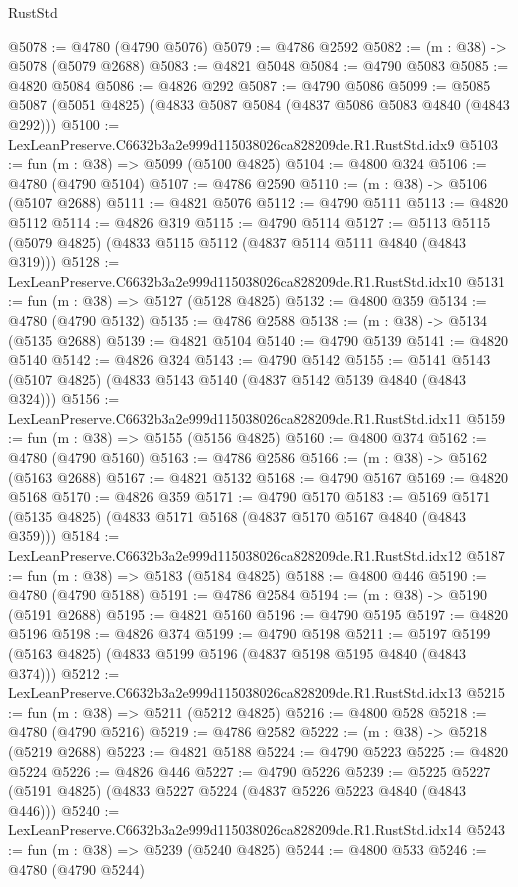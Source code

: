 \begin{lexlean}{RustStd}
\begin{coremodule}
@5078 := @4780 (@4790 @5076)
@5079 := @4786 @2592
@5082 := (m : @38) -> @5078 (@5079 @2688)
@5083 := @4821 @5048
@5084 := @4790 @5083
@5085 := @4820 @5084
@5086 := @4826 @292
@5087 := @4790 @5086
@5099 := @5085 @5087 (@5051 @4825) (@4833 @5087 @5084 (@4837 @5086 @5083 @4840 (@4843 @292)))
@5100 := LexLeanPreserve.C6632b3a2e999d115038026ca828209de.R1.RustStd.idx9
@5103 := fun (m : @38) => @5099 (@5100 @4825)
@5104 := @4800 @324
@5106 := @4780 (@4790 @5104)
@5107 := @4786 @2590
@5110 := (m : @38) -> @5106 (@5107 @2688)
@5111 := @4821 @5076
@5112 := @4790 @5111
@5113 := @4820 @5112
@5114 := @4826 @319
@5115 := @4790 @5114
@5127 := @5113 @5115 (@5079 @4825) (@4833 @5115 @5112 (@4837 @5114 @5111 @4840 (@4843 @319)))
@5128 := LexLeanPreserve.C6632b3a2e999d115038026ca828209de.R1.RustStd.idx10
@5131 := fun (m : @38) => @5127 (@5128 @4825)
@5132 := @4800 @359
@5134 := @4780 (@4790 @5132)
@5135 := @4786 @2588
@5138 := (m : @38) -> @5134 (@5135 @2688)
@5139 := @4821 @5104
@5140 := @4790 @5139
@5141 := @4820 @5140
@5142 := @4826 @324
@5143 := @4790 @5142
@5155 := @5141 @5143 (@5107 @4825) (@4833 @5143 @5140 (@4837 @5142 @5139 @4840 (@4843 @324)))
@5156 := LexLeanPreserve.C6632b3a2e999d115038026ca828209de.R1.RustStd.idx11
@5159 := fun (m : @38) => @5155 (@5156 @4825)
@5160 := @4800 @374
@5162 := @4780 (@4790 @5160)
@5163 := @4786 @2586
@5166 := (m : @38) -> @5162 (@5163 @2688)
@5167 := @4821 @5132
@5168 := @4790 @5167
@5169 := @4820 @5168
@5170 := @4826 @359
@5171 := @4790 @5170
@5183 := @5169 @5171 (@5135 @4825) (@4833 @5171 @5168 (@4837 @5170 @5167 @4840 (@4843 @359)))
@5184 := LexLeanPreserve.C6632b3a2e999d115038026ca828209de.R1.RustStd.idx12
@5187 := fun (m : @38) => @5183 (@5184 @4825)
@5188 := @4800 @446
@5190 := @4780 (@4790 @5188)
@5191 := @4786 @2584
@5194 := (m : @38) -> @5190 (@5191 @2688)
@5195 := @4821 @5160
@5196 := @4790 @5195
@5197 := @4820 @5196
@5198 := @4826 @374
@5199 := @4790 @5198
@5211 := @5197 @5199 (@5163 @4825) (@4833 @5199 @5196 (@4837 @5198 @5195 @4840 (@4843 @374)))
@5212 := LexLeanPreserve.C6632b3a2e999d115038026ca828209de.R1.RustStd.idx13
@5215 := fun (m : @38) => @5211 (@5212 @4825)
@5216 := @4800 @528
@5218 := @4780 (@4790 @5216)
@5219 := @4786 @2582
@5222 := (m : @38) -> @5218 (@5219 @2688)
@5223 := @4821 @5188
@5224 := @4790 @5223
@5225 := @4820 @5224
@5226 := @4826 @446
@5227 := @4790 @5226
@5239 := @5225 @5227 (@5191 @4825) (@4833 @5227 @5224 (@4837 @5226 @5223 @4840 (@4843 @446)))
@5240 := LexLeanPreserve.C6632b3a2e999d115038026ca828209de.R1.RustStd.idx14
@5243 := fun (m : @38) => @5239 (@5240 @4825)
@5244 := @4800 @533
@5246 := @4780 (@4790 @5244)

\end{coremodule}
\end{lexlean}
